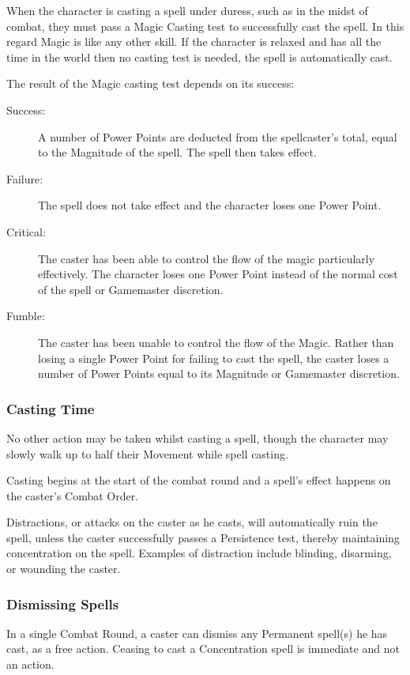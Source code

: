 When the character is casting a spell under duress, such as in the midst of combat, they must pass a Magic Casting test to successfully cast the spell. In this regard Magic is like any other skill. If the character is relaxed and has all the time in the world then no casting test is needed, the spell is automatically cast.

The result of the Magic casting test depends on its success:
\begin{description}
	\item[Success:] A number of Power Points are deducted from the spellcaster’s total, equal to the Magnitude of the spell. The spell then takes effect.
	\item[Failure:] The spell does not take effect and the character loses one Power Point.
  \item[Critical:] The caster has been able to control the flow of the magic particularly effectively. The character loses one Power Point instead of the normal cost of the spell or Gamemaster discretion.
	\item[Fumble:] The caster has been unable to control the flow of the Magic. Rather than losing a single Power Point for failing to cast the spell, the caster loses a number of Power Points equal to its Magnitude or Gamemaster discretion. 
\end{description}



\subsubsection{Casting Time}
No other action may be taken whilst casting a spell, though the character may slowly walk up to half their Movement while spell casting. %

Casting begins at the start of the combat round and a spell’s effect happens on the caster’s Combat Order.%

Distractions, or attacks on the caster as he casts, will automatically ruin the spell, unless the caster successfully passes a Persistence test, thereby maintaining concentration on the spell. Examples of distraction include blinding, disarming, or wounding the caster.

\subsubsection{Dismissing Spells}
In a single Combat Round, a caster can dismiss any Permanent spell(s) he has cast, as a free action. Ceasing to cast a Concentration spell is immediate and not an action. 


